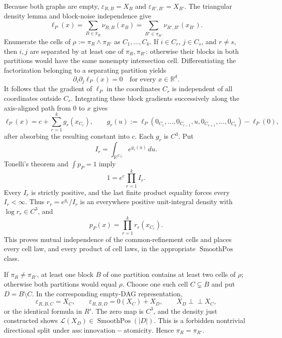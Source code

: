 Because both graphs are empty, \(\varepsilon_{R,B}=X_B\) and \(\varepsilon_{R',B'}=X_{B'}\).  The triangular density lemma and block-noise independence give
\[
 \ell_P(x)=\sum_{B\in\pi_R}\nu_{R,B}(x_B)
 =\sum_{B'\in\pi_{R'}}\nu_{R',B'}(x_{B'}).
\]
Enumerate the cells of \(\rho:=\pi_R\wedge\pi_{R'}\) as \(C_1,\ldots,C_k\).  If \(i\in C_r\), \(j\in C_s\), and \(r\neq s\), then \(i,j\) are separated by at least one of \(\pi_R,\pi_{R'}\): otherwise their blocks in both partitions would have the same nonempty intersection cell.  Differentiating the factorization belonging to a separating partition yields
\[
 \partial_i\partial_j\ell_P(x)=0
 \quad\text{for every }x\in\mathbb R^d.
\]
It follows that the gradient of \(\ell_P\) in the coordinates \(C_r\) is independent of all coordinates outside \(C_r\).  Integrating these block gradients successively along the axis-aligned path from \(0\) to \(x\) gives
\[
 \ell_P(x)=c+\sum_{r=1}^k g_r(x_{C_r}),
 \qquad
 g_r(u):=\ell_P(0_{C_1},\ldots,0_{C_{r-1}},u,0_{C_{r+1}},\ldots,0_{C_k})-\ell_P(0),
\]
after absorbing the resulting constant into \(c\).  Each \(g_r\) is \(C^3\).  Put
\[
 I_r=\int_{\mathbb R^{|C_r|}}e^{g_r(u)}\,du.
\]
Tonelli's theorem and \(\int p_P=1\) imply
\[
 1=e^c\prod_{r=1}^k I_r.
\]
Every \(I_r\) is strictly positive, and the last finite product equality forces every \(I_r<\infty\).  Thus \(r_r=e^{g_r}/I_r\) is an everywhere positive unit-integral density with \(\log r_r\in C^3\), and
\[
 p_P(x)=\prod_{r=1}^k r_r(x_{C_r}).
\]
This proves mutual independence of the common-refinement cells and places every cell law, and every product of cell laws, in the appropriate \(\operatorname{SmoothPos}\) class.

If \(\pi_R\neq\pi_{R'}\), at least one block \(B\) of one partition contains at least two cells of \(\rho\); otherwise both partitions would equal \(\rho\).  Choose one such cell \(C\subsetneq B\) and put \(D=B\setminus C\).  In the corresponding empty-DAG representation,
\[
 \varepsilon_{R,B,C}=X_C,
 \qquad
 \varepsilon_{R,B,D}=0(X_C)+X_D,
 \qquad
 X_D\perp\!\!\!\perp X_C,
\]
or the identical formula in \(R'\).  The zero map is \(C^3\), and the density just constructed shows \(\mathcal L(X_D)\in\operatorname{SmoothPos}(|D|)\).  This is a forbidden nontrivial directional split under \(\mathrm{ass:innovation-atomicity}\).  Hence \(\pi_R=\pi_{R'}\).